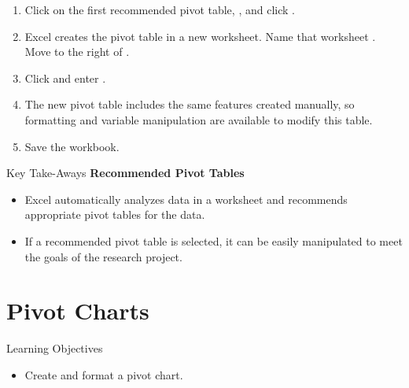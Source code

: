 \begin{enumbox}
\begin{enumerate}
		\item Click on the first recommended pivot table, , and click .
		\item Excel creates the pivot table in a new worksheet. Name that worksheet .
		Move  to the right of .
		\item Click  and enter .
		\item The new pivot table includes the same features created manually, so formatting and variable manipulation are available to modify this table.
		\item Save the  workbook.
	\end{enumerate}
\end{enumbox}
	
\begin{center}
	\begin{tkwbox}{Key Take-Aways}
		\textbf{Recommended Pivot Tables}
		\\
		\begin{itemize}
			\setlength{\itemsep}{0pt}
			\setlength{\parskip}{0pt}
			\setlength{\parsep}{0pt}
			
			\item Excel automatically analyzes data in a worksheet and recommends appropriate pivot tables for the data.
			\item If a recommended pivot table is selected, it can be easily manipulated to meet the goals of the research project.
			
		\end{itemize}
	\end{tkwbox}
\end{center}

\section{Pivot Charts}

\begin{center}
	\begin{objbox}{Learning Objectives}
		\begin{itemize}
			\setlength{\itemsep}{0pt}
			\setlength{\parskip}{0pt}
			\setlength{\parsep}{0pt}
			
			\item Create and format a pivot chart.
			
		\end{itemize}
	\end{objbox}
\end{center}


